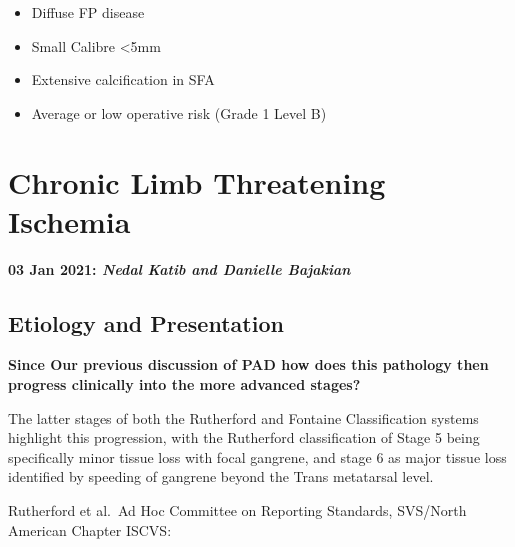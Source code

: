 \documentclass[
]{book}
\begin{document}
\begin{itemize}
\begin{itemize}
\begin{itemize}
      \begin{itemize}
      \item
        Diffuse FP disease
      \item
        Small Calibre \textless5mm
      \item
        Extensive calcification in SFA
      \item
        Average or low operative risk (Grade 1 Level B)
      \end{itemize}
    \end{itemize}
  \end{itemize}
\end{itemize}

\hypertarget{chronic-limb-threatening-ischemia-1}{%
\section{Chronic Limb Threatening Ischemia}\label{chronic-limb-threatening-ischemia-1}}

\textbf{03 Jan 2021: \emph{Nedal Katib and Danielle Bajakian}}

\hypertarget{etiology-and-presentation}{%
\subsection{Etiology and Presentation}\label{etiology-and-presentation}}

\textbf{Since Our previous discussion of PAD how does this pathology then
progress clinically into the more advanced stages?}

The latter stages of both the Rutherford and Fontaine Classification
systems highlight this progression, with the Rutherford classification
of Stage 5 being specifically minor tissue loss with focal gangrene, and
stage 6 as major tissue loss identified by speeding of gangrene beyond
the Trans metatarsal level.

Rutherford et al.~Ad Hoc Committee on Reporting Standards, SVS/North
American Chapter ISCVS:
\end{document}
